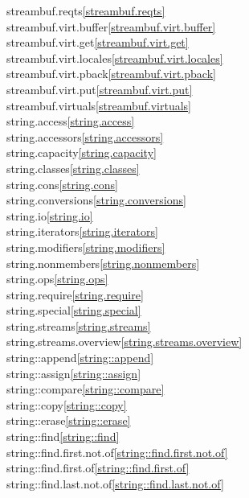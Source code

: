 \begin{multicols}{2}
streambuf.reqts\quad\ref{streambuf.reqts}\\
streambuf.virt.buffer\quad\ref{streambuf.virt.buffer}\\
streambuf.virt.get\quad\ref{streambuf.virt.get}\\
streambuf.virt.locales\quad\ref{streambuf.virt.locales}\\
streambuf.virt.pback\quad\ref{streambuf.virt.pback}\\
streambuf.virt.put\quad\ref{streambuf.virt.put}\\
streambuf.virtuals\quad\ref{streambuf.virtuals}\\
string.access\quad\ref{string.access}\\
string.accessors\quad\ref{string.accessors}\\
string.capacity\quad\ref{string.capacity}\\
string.classes\quad\ref{string.classes}\\
string.cons\quad\ref{string.cons}\\
string.conversions\quad\ref{string.conversions}\\
string.io\quad\ref{string.io}\\
string.iterators\quad\ref{string.iterators}\\
string.modifiers\quad\ref{string.modifiers}\\
string.nonmembers\quad\ref{string.nonmembers}\\
string.ops\quad\ref{string.ops}\\
string.require\quad\ref{string.require}\\
string.special\quad\ref{string.special}\\
string.streams\quad\ref{string.streams}\\
string.streams.overview\quad\ref{string.streams.overview}\\
string::append\quad\ref{string::append}\\
string::assign\quad\ref{string::assign}\\
string::compare\quad\ref{string::compare}\\
string::copy\quad\ref{string::copy}\\
string::erase\quad\ref{string::erase}\\
string::find\quad\ref{string::find}\\
string::find.first.not.of\quad\ref{string::find.first.not.of}\\
string::find.first.of\quad\ref{string::find.first.of}\\
string::find.last.not.of\quad\ref{string::find.last.not.of}\\

\end{multicols}
